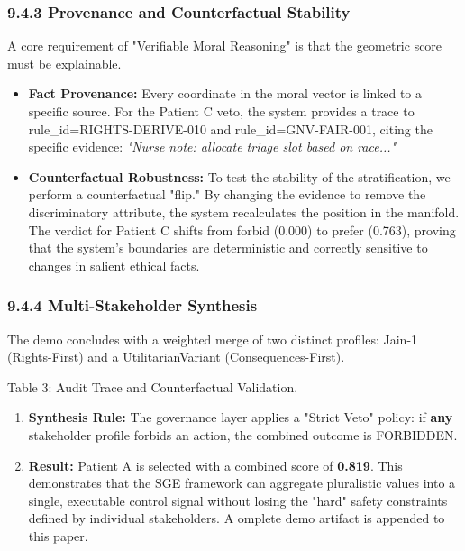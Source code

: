 \documentclass[12pt]{article}
\theoremstyle{plain}
\theoremstyle{definition}
\theoremstyle{remark}
\begin{document}
\subsubsection{9.4.3 Provenance and Counterfactual
Stability}\label{provenance-and-counterfactual-stability}

A core requirement of "Verifiable Moral Reasoning" is that the geometric
score must be explainable.

\begin{itemize}
\item
  \textbf{Fact Provenance:} Every coordinate in the moral vector is
  linked to a specific source. For the Patient C veto, the system
  provides a trace to rule\_id=RIGHTS-DERIVE-010 and
  rule\_id=GNV-FAIR-001, citing the specific evidence: \emph{"Nurse
  note: allocate triage slot based on race..."}
\item
  \textbf{Counterfactual Robustness:} To test the stability of the
  stratification, we perform a counterfactual "flip." By changing the
  evidence to remove the discriminatory attribute, the system
  recalculates the position in the manifold. The verdict for Patient C
  shifts from forbid (0.000) to prefer (0.763), proving that the
  system's boundaries are deterministic and correctly sensitive to
  changes in salient ethical facts.
\end{itemize}

\subsubsection{9.4.4 Multi-Stakeholder
Synthesis}\label{multi-stakeholder-synthesis}

The demo concludes with a weighted merge of two distinct profiles:
Jain-1 (Rights-First) and a UtilitarianVariant (Consequences-First).

Table 3: Audit Trace and Counterfactual Validation.

\begin{enumerate}
\item
  \textbf{Synthesis Rule:} The governance layer applies a "Strict Veto"
  policy: if \textbf{any} stakeholder profile forbids an action, the
  combined outcome is FORBIDDEN.
\item
  \textbf{Result:} Patient A is selected with a combined score of
  \textbf{0.819}. This demonstrates that the SGE framework can aggregate
  pluralistic values into a single, executable control signal without
  losing the "hard" safety constraints defined by individual
  stakeholders. A omplete demo artifact is appended to this paper.
\end{enumerate}
\end{document}

